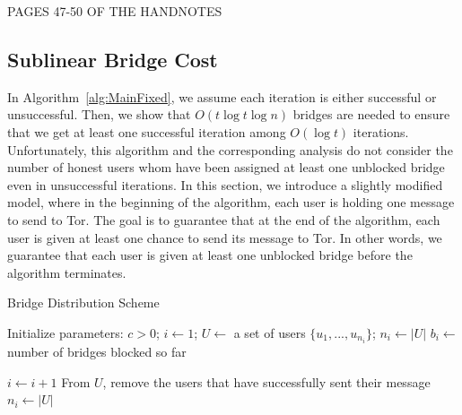 PAGES 47-50 OF THE HANDNOTES

\subsection{Sublinear Bridge Cost}
In Algorithm~\ref{alg:MainFixed}, we assume each iteration is either successful or unsuccessful. Then, we show that $O(t\log{t}\log{n})$ bridges are needed to ensure that we get at least one successful iteration among $O(\log{t})$ iterations. Unfortunately, this algorithm and the corresponding analysis do not consider the number of honest users whom have been assigned at least one unblocked bridge even in unsuccessful iterations. In this section, we introduce a slightly modified model, where in the beginning of the algorithm, each user is holding one message to send to Tor. The goal is to guarantee that at the end of the algorithm, each user is given at least one chance to send its message to Tor. In other words, we guarantee that each user is given at least one unblocked bridge before the algorithm terminates.

\begin{algorithm}[H]
	\caption{Bridge Distribution Scheme}
	\label{alg:MainFinal}
	
	\algFont \vspace{2pt}
	\begin{algorithmic}[1]
		\State Initialize parameters: $c > 0$; $i \gets 1$; $U \gets$ a set of users $\{u_1,...,u_{n_i}\}$; $n_i \gets |U|$
		\State {} %
			\State $b_i \gets$ number of bridges blocked so far %

			 \label{ln:ConditionFinal}
				\State $i \gets i+1$ \label{ln:IncrementFinal} %
					\State {} \label{ln:DistributeFinal} %
				\EndFor
			\EndIf
			\State From $U$, remove the users that have successfully sent their message
			\State $n_i \gets |U|$ %
		\EndWhile
	\end{algorithmic}
\end{algorithm}

